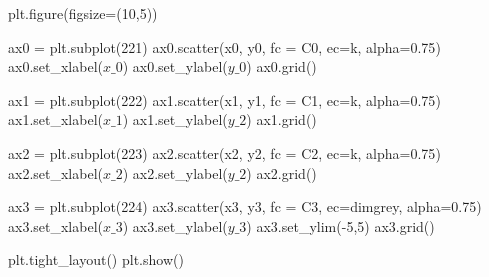 \documentclass[
  letterpaper,
  DIV=11,
  numbers=noendperiod]{scrreprt}
\newenvironment{Shaded}{\begin{snugshade}}{\end{snugshade}}
\newcommand{\DecValTok}[1]{\textcolor[rgb]{0.68,0.00,0.00}{#1}}
\newcommand{\FloatTok}[1]{\textcolor[rgb]{0.68,0.00,0.00}{#1}}
\newcommand{\NormalTok}[1]{\textcolor[rgb]{0.00,0.23,0.31}{#1}}
\newcommand{\OperatorTok}[1]{\textcolor[rgb]{0.37,0.37,0.37}{#1}}
\newcommand{\StringTok}[1]{\textcolor[rgb]{0.13,0.47,0.30}{#1}}
\begin{document}
\begin{Shaded}
\begin{Highlighting}[]
\NormalTok{plt.figure(figsize}\OperatorTok{=}\NormalTok{(}\DecValTok{10}\NormalTok{,}\DecValTok{5}\NormalTok{))}

\NormalTok{ax0 }\OperatorTok{=}\NormalTok{ plt.subplot(}\DecValTok{221}\NormalTok{)}
\NormalTok{ax0.scatter(x0, y0, fc }\OperatorTok{=} \StringTok{\textquotesingle{}C0\textquotesingle{}}\NormalTok{, ec}\OperatorTok{=}\StringTok{\textquotesingle{}k\textquotesingle{}}\NormalTok{, alpha}\OperatorTok{=}\FloatTok{0.75}\NormalTok{)}
\NormalTok{ax0.set\_xlabel(}\StringTok{\textquotesingle{}$x\_0$\textquotesingle{}}\NormalTok{)}
\NormalTok{ax0.set\_ylabel(}\StringTok{\textquotesingle{}$y\_0$\textquotesingle{}}\NormalTok{)}
\NormalTok{ax0.grid()}

\NormalTok{ax1 }\OperatorTok{=}\NormalTok{ plt.subplot(}\DecValTok{222}\NormalTok{)}
\NormalTok{ax1.scatter(x1, y1, fc }\OperatorTok{=} \StringTok{\textquotesingle{}C1\textquotesingle{}}\NormalTok{, ec}\OperatorTok{=}\StringTok{\textquotesingle{}k\textquotesingle{}}\NormalTok{, alpha}\OperatorTok{=}\FloatTok{0.75}\NormalTok{)}
\NormalTok{ax1.set\_xlabel(}\StringTok{\textquotesingle{}$x\_1$\textquotesingle{}}\NormalTok{)}
\NormalTok{ax1.set\_ylabel(}\StringTok{\textquotesingle{}$y\_2$\textquotesingle{}}\NormalTok{)}
\NormalTok{ax1.grid()}

\NormalTok{ax2 }\OperatorTok{=}\NormalTok{ plt.subplot(}\DecValTok{223}\NormalTok{)}
\NormalTok{ax2.scatter(x2, y2, fc }\OperatorTok{=} \StringTok{\textquotesingle{}C2\textquotesingle{}}\NormalTok{, ec}\OperatorTok{=}\StringTok{\textquotesingle{}k\textquotesingle{}}\NormalTok{, alpha}\OperatorTok{=}\FloatTok{0.75}\NormalTok{)}
\NormalTok{ax2.set\_xlabel(}\StringTok{\textquotesingle{}$x\_2$\textquotesingle{}}\NormalTok{)}
\NormalTok{ax2.set\_ylabel(}\StringTok{\textquotesingle{}$y\_2$\textquotesingle{}}\NormalTok{)}
\NormalTok{ax2.grid()}

\NormalTok{ax3 }\OperatorTok{=}\NormalTok{ plt.subplot(}\DecValTok{224}\NormalTok{)}
\NormalTok{ax3.scatter(x3, y3, fc }\OperatorTok{=} \StringTok{\textquotesingle{}C3\textquotesingle{}}\NormalTok{, ec}\OperatorTok{=}\StringTok{\textquotesingle{}dimgrey\textquotesingle{}}\NormalTok{, alpha}\OperatorTok{=}\FloatTok{0.75}\NormalTok{)}
\NormalTok{ax3.set\_xlabel(}\StringTok{\textquotesingle{}$x\_3$\textquotesingle{}}\NormalTok{)}
\NormalTok{ax3.set\_ylabel(}\StringTok{\textquotesingle{}$y\_3$\textquotesingle{}}\NormalTok{)}
\NormalTok{ax3.set\_ylim(}\OperatorTok{{-}}\DecValTok{5}\NormalTok{,}\DecValTok{5}\NormalTok{)}
\NormalTok{ax3.grid()}

\NormalTok{plt.tight\_layout()}
\NormalTok{plt.show()}
\end{Highlighting}
\end{Shaded}
\end{document}
